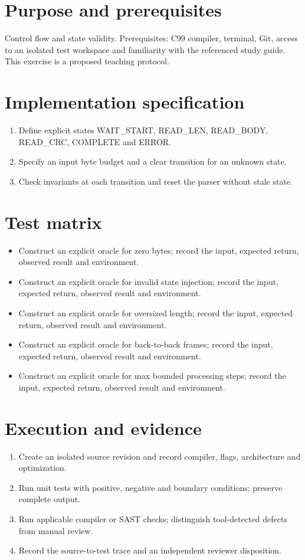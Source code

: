 \documentclass[10pt,letterpaper]{article}
\begin{document}
\makedoctitle
\makedocsummary
\section{Purpose and prerequisites}
Control flow and state validity. Prerequisites: C99 compiler, terminal, Git, access to an isolated test workspace and familiarity with the referenced study guide. This exercise is a proposed teaching protocol.
\section{Implementation specification}
\begin{enumerate}
\item Define explicit states WAIT\_START, READ\_LEN, READ\_BODY, READ\_CRC, COMPLETE and ERROR.
\item Specify an input byte budget and a clear transition for an unknown state.
\item Check invariants at each transition and reset the parser without stale state.
\end{enumerate}

\section{Test matrix}
\begin{itemize}
\item Construct an explicit oracle for zero bytes; record the input, expected return, observed result and environment.
\item Construct an explicit oracle for invalid state injection; record the input, expected return, observed result and environment.
\item Construct an explicit oracle for oversized length; record the input, expected return, observed result and environment.
\item Construct an explicit oracle for back-to-back frames; record the input, expected return, observed result and environment.
\item Construct an explicit oracle for max bounded processing steps; record the input, expected return, observed result and environment.
\end{itemize}

\section{Execution and evidence}
\begin{enumerate}
\item Create an isolated source revision and record compiler, flags, architecture and optimization.
\item Run unit tests with positive, negative and boundary conditions; preserve complete output.
\item Run applicable compiler or SAST checks; distinguish tool-detected defects from manual review.
\item Record the source-to-test trace and an independent reviewer disposition.
\end{enumerate}
\end{document}
